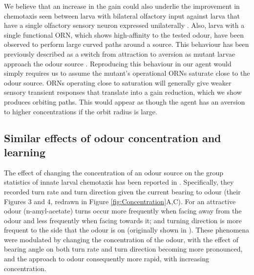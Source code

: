 \documentclass[11pt,a4paper]{article}
\newcommand{\todoML}[1]{\todo[author=ML,color=white, size=\tiny,inline]{#1}}
\begin{document}
We believe that an increase in the gain could also underlie the improvement in chemotaxis seen between larva with bilateral olfactory input against larva that have a single olfactory sensory neuron expressed unilaterally  \citep{louis2008bilateral}. 
  Also, larva with a single functional ORN, which shows high-affinity to the tested odour, have been observed to perform large curved paths around a source. This behaviour has been previously described as a switch from attraction to aversion as mutant larvae approach the odour source \citep{gomez2011active, kreher2008translation}. %
  Reproducing this behaviour in our agent would simply requires us to assume the mutant's operational ORNs saturate close to the odour source. ORNs operating close to saturation will generally give weaker sensory transient responses that translate into a gain reduction, which we show produces orbiting paths. This would appear as though the agent has an aversion to higher concentrations if the orbit radius is large.
 
 


\subsection{Similar effects of odour concentration and learning}
The effect of changing the concentration of an odour source on the group statistics of innate larval chemotaxis has been reported in \citep{schleyer2015learning}. Specifically, they recorded turn rate and turn direction given the current bearing to odour (their Figures 3 and 4, redrawn in Figure \ref{fig:Concentration}A,C). For an attractive odour (n-amyl-acetate) turns occur more frequently when facing away from the odour and less frequently when facing towards it; and turning direction is more frequent to the side that the odour is on (originally shown in \citet{gomez2011active}). These phenomena were modulated by changing the concentration of the odour, with the effect of bearing angle on both turn rate and turn direction becoming more pronounced, and the approach to odour consequently more rapid, with increasing concentration. 
\end{document}
